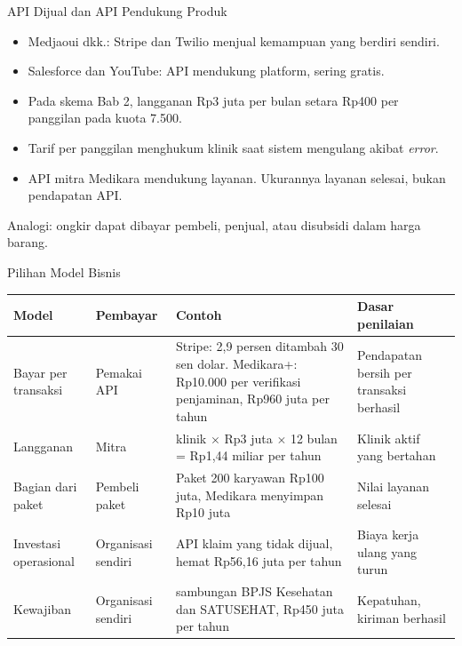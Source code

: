 \documentclass[aspectratio=169, table, 12pt]{beamer}
\begin{document}
\begin{frame}{{\Large API Dijual dan API Pendukung Produk}}
  \vspace{10pt}
  \begin{itemize}
    \item Medjaoui dkk.: Stripe dan Twilio menjual kemampuan yang berdiri sendiri.
    \item Salesforce dan YouTube: API mendukung platform, sering gratis.
    \item Pada skema Bab 2, langganan Rp3 juta per bulan setara Rp400 per panggilan pada kuota 7.500.
    \item Tarif per panggilan menghukum klinik saat sistem mengulang akibat \textit{error}.
    \item API mitra Medikara mendukung layanan. Ukurannya layanan selesai, bukan pendapatan API.
  \end{itemize}
  \vspace{6pt}
  {\small Analogi: ongkir dapat dibayar pembeli, penjual, atau disubsidi dalam harga barang.}
\end{frame}

\begin{frame}{{\Large Pilihan Model Bisnis}}
  \scriptsize
  \begin{tabularx}{\textwidth}{>{\raggedright\arraybackslash}p{2.6cm}
      >{\raggedright\arraybackslash}p{2.2cm} >{\raggedright\arraybackslash}X >{\raggedright\arraybackslash}X}
    \hline
    \textbf{Model} & \textbf{Pembayar} & \textbf{Contoh} & \textbf{Dasar penilaian} \\ \hline
    Bayar per transaksi & Pemakai API & Stripe: 2,9 persen ditambah 30 sen dolar. Medikara+: Rp10.000 per verifikasi penjaminan, Rp960 juta per tahun & Pendapatan bersih per transaksi berhasil \\ \hline
    Langganan & Mitra & 40 klinik $\times$ Rp3 juta $\times$ 12 bulan = Rp1,44 miliar per tahun & Klinik aktif yang bertahan \\ \hline
    Bagian dari paket & Pembeli paket & Paket 200 karyawan Rp100 juta, Medikara menyimpan Rp10 juta & Nilai layanan selesai \\ \hline
    Investasi operasional & Organisasi sendiri & API klaim yang tidak dijual, hemat Rp56,16 juta per tahun & Biaya kerja ulang yang turun \\ \hline
    Kewajiban & Organisasi sendiri & 10 sambungan BPJS Kesehatan dan SATUSEHAT, Rp450 juta per tahun & Kepatuhan, kiriman berhasil \\ \hline
  \end{tabularx}
\end{frame}
\end{document}

